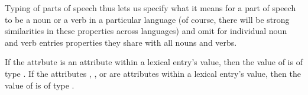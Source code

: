 \documentclass[output=paper]{langsci/langscibook}
\begin{document}
Typing of parts of speech thus lets us specify what it means for a part of speech to be a noun or a verb in a particular language (of course, there will be strong similarities in these properties across languages) and omit for individual noun and verb entries properties they share with all nouns and verbs.


\begin{exe}
	\ex\label{pos-def}
	\begin{xlist}
		\ex\label{pos-def-a}
		If the attrbute  is an attribute within a lexical entry's  value, then the value of  is of type .
		\ex\label{pos-def-b}	
		If the attributes , , or  are attributes within a lexical entry's  value, then the value of  is of type .
	\end{xlist}
\end{exe}




\end{document}
